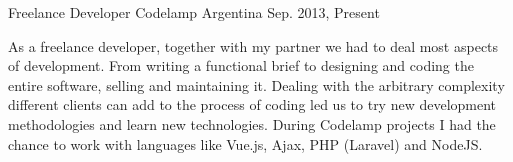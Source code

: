 \begin{cventries}
\cventry
{Freelance Developer} %
{Codelamp} %
{Argentina} %
{Sep. 2013, Present} %
{
\begin{cvitems}
As a freelance developer, together with my partner we had to deal most aspects of development. From writing a functional brief to designing and coding the entire software, selling and maintaining it.
Dealing with the arbitrary complexity different clients can add to the process of coding led us to try new development methodologies and learn new technologies.
During Codelamp projects I had the chance to work with languages like Vue.js, Ajax, PHP (Laravel) and NodeJS.
\end{cvitems}
}


\end{cventries}

